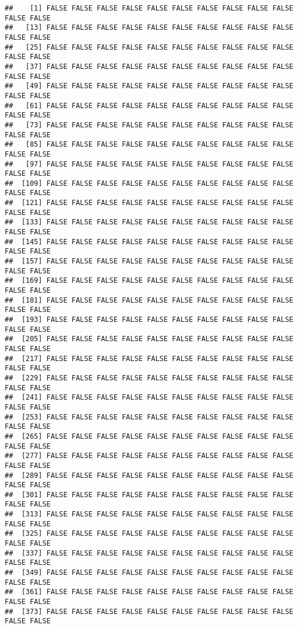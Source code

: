 \documentclass[
]{article}
\begin{document}
\begin{verbatim}
##    [1] FALSE FALSE FALSE FALSE FALSE FALSE FALSE FALSE FALSE FALSE FALSE FALSE
##   [13] FALSE FALSE FALSE FALSE FALSE FALSE FALSE FALSE FALSE FALSE FALSE FALSE
##   [25] FALSE FALSE FALSE FALSE FALSE FALSE FALSE FALSE FALSE FALSE FALSE FALSE
##   [37] FALSE FALSE FALSE FALSE FALSE FALSE FALSE FALSE FALSE FALSE FALSE FALSE
##   [49] FALSE FALSE FALSE FALSE FALSE FALSE FALSE FALSE FALSE FALSE FALSE FALSE
##   [61] FALSE FALSE FALSE FALSE FALSE FALSE FALSE FALSE FALSE FALSE FALSE FALSE
##   [73] FALSE FALSE FALSE FALSE FALSE FALSE FALSE FALSE FALSE FALSE FALSE FALSE
##   [85] FALSE FALSE FALSE FALSE FALSE FALSE FALSE FALSE FALSE FALSE FALSE FALSE
##   [97] FALSE FALSE FALSE FALSE FALSE FALSE FALSE FALSE FALSE FALSE FALSE FALSE
##  [109] FALSE FALSE FALSE FALSE FALSE FALSE FALSE FALSE FALSE FALSE FALSE FALSE
##  [121] FALSE FALSE FALSE FALSE FALSE FALSE FALSE FALSE FALSE FALSE FALSE FALSE
##  [133] FALSE FALSE FALSE FALSE FALSE FALSE FALSE FALSE FALSE FALSE FALSE FALSE
##  [145] FALSE FALSE FALSE FALSE FALSE FALSE FALSE FALSE FALSE FALSE FALSE FALSE
##  [157] FALSE FALSE FALSE FALSE FALSE FALSE FALSE FALSE FALSE FALSE FALSE FALSE
##  [169] FALSE FALSE FALSE FALSE FALSE FALSE FALSE FALSE FALSE FALSE FALSE FALSE
##  [181] FALSE FALSE FALSE FALSE FALSE FALSE FALSE FALSE FALSE FALSE FALSE FALSE
##  [193] FALSE FALSE FALSE FALSE FALSE FALSE FALSE FALSE FALSE FALSE FALSE FALSE
##  [205] FALSE FALSE FALSE FALSE FALSE FALSE FALSE FALSE FALSE FALSE FALSE FALSE
##  [217] FALSE FALSE FALSE FALSE FALSE FALSE FALSE FALSE FALSE FALSE FALSE FALSE
##  [229] FALSE FALSE FALSE FALSE FALSE FALSE FALSE FALSE FALSE FALSE FALSE FALSE
##  [241] FALSE FALSE FALSE FALSE FALSE FALSE FALSE FALSE FALSE FALSE FALSE FALSE
##  [253] FALSE FALSE FALSE FALSE FALSE FALSE FALSE FALSE FALSE FALSE FALSE FALSE
##  [265] FALSE FALSE FALSE FALSE FALSE FALSE FALSE FALSE FALSE FALSE FALSE FALSE
##  [277] FALSE FALSE FALSE FALSE FALSE FALSE FALSE FALSE FALSE FALSE FALSE FALSE
##  [289] FALSE FALSE FALSE FALSE FALSE FALSE FALSE FALSE FALSE FALSE FALSE FALSE
##  [301] FALSE FALSE FALSE FALSE FALSE FALSE FALSE FALSE FALSE FALSE FALSE FALSE
##  [313] FALSE FALSE FALSE FALSE FALSE FALSE FALSE FALSE FALSE FALSE FALSE FALSE
##  [325] FALSE FALSE FALSE FALSE FALSE FALSE FALSE FALSE FALSE FALSE FALSE FALSE
##  [337] FALSE FALSE FALSE FALSE FALSE FALSE FALSE FALSE FALSE FALSE FALSE FALSE
##  [349] FALSE FALSE FALSE FALSE FALSE FALSE FALSE FALSE FALSE FALSE FALSE FALSE
##  [361] FALSE FALSE FALSE FALSE FALSE FALSE FALSE FALSE FALSE FALSE FALSE FALSE
##  [373] FALSE FALSE FALSE FALSE FALSE FALSE FALSE FALSE FALSE FALSE FALSE FALSE

\end{verbatim}
\end{document}

